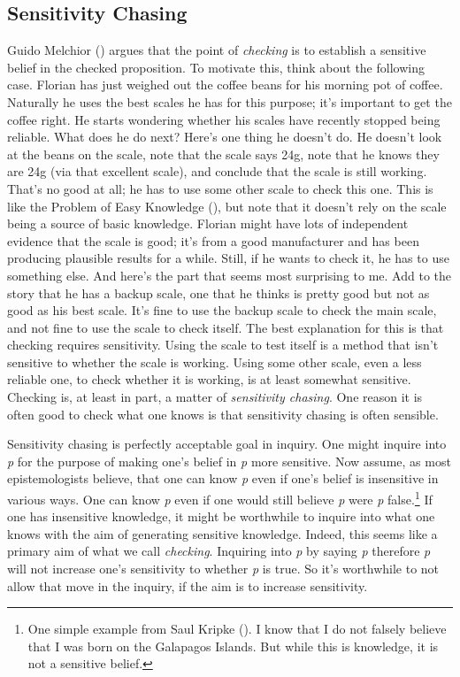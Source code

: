 \documentclass[
  12pt,
  letterpaper,
]{scrbook}
\begin{document}
\subsection{Sensitivity Chasing}\label{sec-sensitiveinquiry}

Guido Melchior () argues that the point
of \emph{checking} is to establish a sensitive belief in the checked
proposition. To motivate this, think about the following case. Florian
has just weighed out the coffee beans for his morning pot of coffee.
Naturally he uses the best scales he has for this purpose; it's
important to get the coffee right. He starts wondering whether his
scales have recently stopped being reliable. What does he do next?
Here's one thing he doesn't do. He doesn't look at the beans on the
scale, note that the scale says 24g, note that he knows they are 24g
(via that excellent scale), and conclude that the scale is still
working. That's no good at all; he has to use some other scale to check
this one. This is like the Problem of Easy Knowledge
(), but note that it doesn't rely
on the scale being a source of basic knowledge. Florian might have lots
of independent evidence that the scale is good; it's from a good
manufacturer and has been producing plausible results for a while.
Still, if he wants to check it, he has to use something else. And here's
the part that seems most surprising to me. Add to the story that he has
a backup scale, one that he thinks is pretty good but not as good as his
best scale. It's fine to use the backup scale to check the main scale,
and not fine to use the scale to check itself. The best explanation for
this is that checking requires sensitivity. Using the scale to test
itself is a method that isn't sensitive to whether the scale is working.
Using some other scale, even a less reliable one, to check whether it is
working, is at least somewhat sensitive. Checking is, at least in part,
a matter of \emph{sensitivity chasing}. One reason it is often good to
check what one knows is that sensitivity chasing is often sensible.

Sensitivity chasing is perfectly acceptable goal in inquiry. One might
inquire into \emph{p} for the purpose of making one's belief in \emph{p}
more sensitive. Now assume, as most epistemologists believe, that one
can know \emph{p} even if one's belief is insensitive in various ways.
One can know \emph{p} even if one would still believe \emph{p} were
\emph{p} false.\footnote{One simple example from Saul Kripke
  (). I know that I do not falsely
  believe that I was born on the Galapagos Islands. But while this is
  knowledge, it is not a sensitive belief.} If one has insensitive
knowledge, it might be worthwhile to inquire into what one knows with
the aim of generating sensitive knowledge. Indeed, this seems like a
primary aim of what we call \emph{checking}. Inquiring into \emph{p} by
saying \emph{p} therefore \emph{p} will not increase one's sensitivity
to whether \emph{p} is true. So it's worthwhile to not allow that move
in the inquiry, if the aim is to increase sensitivity.
\end{document}
